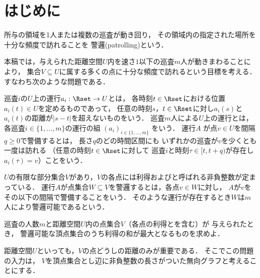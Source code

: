
\section{はじめに}
所与の領域を1人または複数の巡査が動き回り，
その領域内の指定された場所を十分な頻度で訪れることを
警邏(patrolling)という\cite{chen2013fence, coene2011charlemagne, czyzowicz2011boundary}．


本稿では，与えられた距離空間$U$内を速さ$1$以下の巡査$m$人が動きまわることにより，
集合$V \subseteq U$に属する多くの点に十分な頻度で訪れるという目標を考える．
すなわち次のような問題である．

巡査$i$の$U$上の運行$a_i: \Rset \to U$とは，
各時刻$t \in \Rset$における位置$a _i (t) \in U$を定めるものであって，
任意の時刻$s$，$t \in \Rset$に対し$a _i (s)$と$a _i (t)$の距離が$\lvert s - t \rvert$を超えないものをいう．
%
巡査$m$人による$U$上の運行とは，
各巡査$i \in \{1, \ldots, m\}$の運行の組
$(a _i) _{i \in \{1, \ldots, m\}}$
をいう．
%
%
運行$A$
が点$v \in U$を間隔$q \geq 0$で警備するとは，
長さ$q$のどの時間区間にも
いずれかの巡査が$v$を少くとも一度は訪れる
（任意の時刻$t \in \Rset$に対して
巡査$i$と時刻$\tau \in [t, t + q)$が存在し
$a _i (\tau) = v$）ことをいう．

$U$の有限な部分集合$V$があり，$V$の各点には利得および{\timelimit}と呼ばれる非負整数が定まっている．
運行$A$が点集合$W \subseteq V$を警邏するとは，各点$v \in W$に対し，
$A$が$v$をその{\timelimit}以下の間隔で警備することをいう．
そのような運行が存在するとき$W$は$m$人により警邏可能であるという．

\begin{cooperativepatrollingproblem}
    巡査の人数$m$と距離空間$U$内の点集合$V$（各点の利得と{\timelimit}を含む）が
    与えられたとき，
    警邏可能な頂点集合のうち利得の和が最大となるものを求めよ．
\end{cooperativepatrollingproblem}

距離空間$U$といっても，$V$の点どうしの距離のみが重要である．
そこでこの問題の入力は，
$V$を頂点集合とし辺に非負整数の長さがついた無向グラフと考えることにする．



